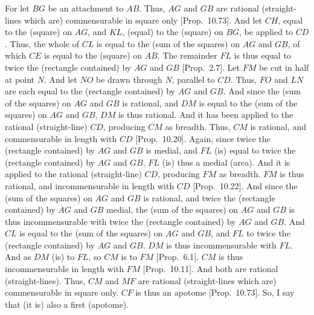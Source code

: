 \begin{Parallel}{}{}
{For let $BG$ be an attachment to $AB$. Thus, $AG$ and $GB$
are rational (straight-lines which are) commensurable in square only
[Prop.~10.73]. And let $CH$, equal to the
(square) on $AG$, and $KL$, (equal) to the (square) on $BG$, be applied to $CD$. Thus, the whole of $CL$ is equal to the (sum of the
squares) on $AG$ and $GB$, of which $CE$ is equal to the (square) on
$AB$. The remainder $FL$ is thus equal to twice the (rectangle contained)
by $AG$ and $GB$ [Prop.~2.7]. Let $FM$
be cut in half at point $N$. And let $NO$ be drawn
through $N$, parallel to $CD$. Thus, $FO$ and $LN$ are each equal to
the (rectangle contained) by $AG$ and $GB$. And since the (sum of the
squares) on $AG$ and $GB$ is rational, and $DM$ is equal to the (sum of the squares) on
$AG$ and $GB$, $DM$ is thus rational. And it has
been applied to the rational (straight-line) $CD$, producing $CM$ as breadth. Thus, $CM$
is rational, and commensurable in length with $CD$ [Prop.~10.20]. Again, since twice the
(rectangle contained) by $AG$ and $GB$ is medial, and $FL$
(is) equal to twice the (rectangle contained) by $AG$ and $GB$, $FL$
(is) thus a medial (area). And it is applied to the rational (straight-line)
$CD$, producing $FM$ as breadth. $FM$ is thus rational, and
incommensurable in  length with $CD$ [Prop.~10.22]. And since the (sum of the
squares) on $AG$ and $GB$ is rational, and twice the (rectangle contained)
by $AG$ and $GB$ medial, the (sum of the squares) on
$AG$ and $GB$ is thus incommensurable with twice the (rectangle
contained) by $AG$ and $GB$. And $CL$ is equal to the (sum of the
squares) on $AG$ and $GB$, and $FL$ to twice the (rectangle contained)
by $AG$ and $GB$. $DM$ is thus incommensurable with $FL$.
And as $DM$ (is) to $FL$, so $CM$ is to $FM$ [Prop.~6.1]. $CM$ is thus incommensurable in length
with $FM$ [Prop.~10.11]. And both are rational 
(straight-lines). Thus, $CM$ and $MF$ are rational (straight-lines
which are) commensurable in square only. $CF$ is thus an apotome
[Prop.~10.73]. So, I say that
(it is) also a first (apotome).

}
\end{Parallel}
